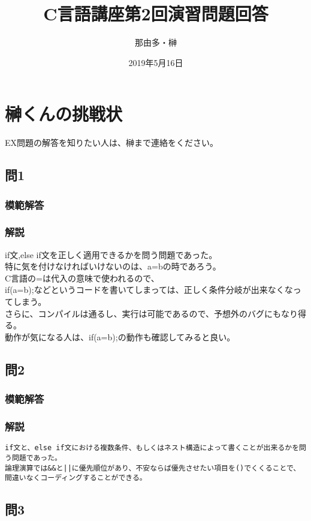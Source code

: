\documentclass[a4j,titlepage,dvipdfmx]{jsarticle}   %
\title{C言語講座第2回演習問題回答}
\author{那由多・榊}
\date{2019年5月16日}
\newcommand{\codepath}{./code}
\begin{document}
\section{榊くんの挑戦状}
EX問題の解答を知りたい人は、榊まで連絡をください。
\subsection{問1}
\subsubsection{模範解答}

\subsubsection{解説}
if文,else if文を正しく適用できるかを問う問題であった。\\
特に気を付けなければいけないのは、a=bの時であろう。\\
C言語の=は代入の意味で使われるので、\\
if(a=b){;}などというコードを書いてしまっては、正しく条件分岐が出来なくなってしまう。\\
さらに、コンパイルは通るし、実行は可能であるので、予想外のバグにもなり得る。\\
動作が気になる人は、if(a=b){;}の動作も確認してみると良い。\\

\subsection{問2}
\subsubsection{模範解答}

\subsubsection{解説}
\begin{verbatim}
if文と、else if文における複数条件、もしくはネスト構造によって書くことが出来るかを問う問題であった。
論理演算では&&と||に優先順位があり、不安ならば優先させたい項目を()でくくることで、間違いなくコーディングすることができる。
\end{verbatim}
\subsection{問3}
\end{document}
